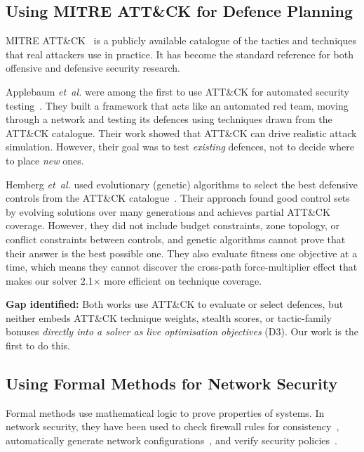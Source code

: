 \documentclass[journal]{IEEEtran}
\newcommand{\etal}{\emph{et~al.}}
\begin{document}
\subsection{Using MITRE ATT\&CK for Defence Planning}

MITRE ATT\&CK~\cite{mitre2023} is a publicly available
catalogue of the tactics and techniques that real attackers
use in practice.
It has become the standard reference for both offensive and
defensive security research.

Applebaum \etal{} were among the first to use ATT\&CK for
automated security testing~\cite{applebaum2016}.
They built a framework that acts like an automated red team,
moving through a network and testing its defences using
techniques drawn from the ATT\&CK catalogue.
Their work showed that ATT\&CK can drive realistic attack
simulation. However, their goal was to test \emph{existing}
defences, not to decide where to place \emph{new} ones.

Hemberg \etal{} used evolutionary (genetic) algorithms to
select the best defensive controls from the ATT\&CK
catalogue~\cite{hemberg2020}.
Their approach found good control sets by evolving solutions
over many generations and achieves partial ATT\&CK coverage.
However, they did not include budget constraints, zone
topology, or conflict constraints between controls, and
genetic algorithms cannot prove that their answer is the
best possible one.
They also evaluate fitness one objective at a time, which
means they cannot discover the cross-path force-multiplier
effect that makes our solver 2.1$\times$ more efficient on
technique coverage.

\textbf{Gap identified:} Both works use ATT\&CK to evaluate
or select defences, but neither embeds ATT\&CK technique
weights, stealth scores, or tactic-family bonuses
\emph{directly into a solver as live optimisation objectives}
(D3).
Our work is the first to do this.

\subsection{Using Formal Methods for Network Security}

Formal methods use mathematical logic to prove properties of
systems.
In network security, they have been used to check firewall
rules for consistency~\cite{al2011}, automatically generate
network configurations~\cite{jeffrey2009}, and verify
security policies~\cite{fisler2005}.
\end{document}
